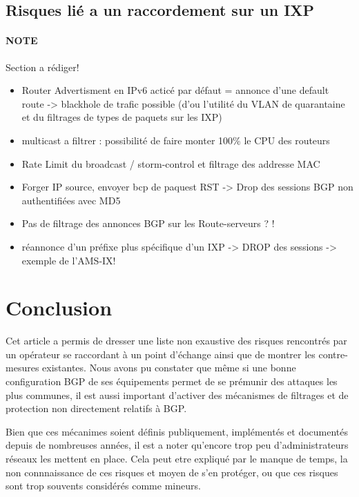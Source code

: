 \subsection{Risques lié a un raccordement sur un IXP}

\paragraph{NOTE} Section a rédiger!
\begin{itemize}
\item Router Advertisment en IPv6 acticé par défaut = annonce d'une default route -> blackhole de trafic possible (d'ou l'utilité du VLAN de quarantaine et du filtrages de types de paquets sur les IXP)
\item multicast a filtrer : possibilité de faire monter 100\% le CPU des routeurs
\item Rate Limit du broadcast / storm-control et filtrage des addresse MAC
\item Forger IP source, envoyer bcp de paquest RST -> Drop des sessions BGP non authentifiées avec MD5
\item Pas de filtrage des annonces BGP sur les Route-serveurs ? ! 
\item réannonce d'un préfixe plus spécifique d'un IXP -> DROP des sessions -> exemple de l'AMS-IX!
\end{itemize}


\section{Conclusion}

Cet article a permis de dresser une liste non exaustive des risques rencontrés par un opérateur se raccordant à un point d'échange ainsi que de montrer les contre-mesures existantes.
Nous avons pu constater que même si une bonne configuration BGP de ses équipements permet de se prémunir des attaques les plus communes, il est aussi important d'activer des mécanismes de filtrages et de protection non directement relatifs à BGP.

Bien que ces mécanimes soient définis publiquement, implémentés et documentés depuis de nombreuses années, il est a noter qu'encore trop peu d'administrateurs réseaux les mettent en place. Cela peut etre expliqué par le manque de temps, la non connnaissance de ces risques et moyen de s'en protéger, ou que ces risques sont trop souvents considérés comme mineurs.



